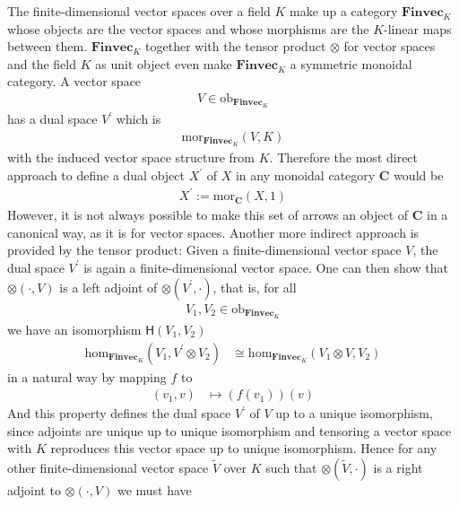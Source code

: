 \begin{exa}
\label{exa:finvecmoncat}
The finite-dimensional vector spaces over a field $K$ make up a category $\mathbf{Finvec}_{K}$ whose objects are the vector spaces and whose morphisms are the $K$-linear maps between them.
$\mathbf{Finvec}_{K}$ together with the tensor product $\otimes$ for vector spaces and the field $K$ as unit object even make $\mathbf{Finvec}_{K}$ a symmetric monoidal category.
A vector space
\begin{align*}
  V
  \in
  \mathrm{ob}_{\mathbf{Finvec}_{K}}
\end{align*}
has a dual space $V^{\prime}$ which is
\begin{align*}
  \mathrm{mor}_{\mathbf{Finvec}_{K}}(V,K)
\end{align*}
with the induced vector space structure from $K$.
Therefore the most direct approach to define a dual object $X^{\prime}$ of $X$ in any monoidal category $\mathbf{C}$ would be
\begin{align*}
  X^{\prime}
  :=
  \mathrm{mor}_{\mathbf{C}}(X,1)
\end{align*}
However, it is not always possible to make this set of arrows an object of $\mathbf{C}$ in a canonical way, as it is for vector spaces.
Another more indirect approach is provided by the tensor product: Given a finite-dimensional vector space $V$, the dual space $V^{\prime}$ is again a finite-dimensional vector space.
One can then show that $\otimes(\cdot,V)$ is a left adjoint of $\otimes(V^{\prime},\cdot)$, that is, for all
\begin{align*}
  V_{1},
  V_{2}
  \in
  \mathrm{ob}_{\mathbf{Finvec}_{K}}
\end{align*}
we have an isomorphism $\mathsf{H}(V_{1},V_{2})$
\begin{align*}
  \mathrm{hom}_{\mathbf{Finvec}_{K}}
  \left(
    V_{1},
    V^{\prime}
    \otimes
    V_{2}
  \right)
  &\cong
  \mathrm{hom}_{\mathbf{Finvec}_{K}}
  \left(
    V_{1}
    \otimes
    V,
    V_{2}
  \right)
\end{align*}
in a natural way by mapping $f$ to
\begin{align*}
  (v_{1},v)
  &\mapsto
  \left(
    f(v_{1})
  \right)
  (v)
\end{align*}
And this property defines the dual space $V^{\prime}$ of $V$ up to a unique isomorphism, since adjoints are unique up to unique isomorphism and tensoring a vector space with $K$ reproduces this vector space up to unique isomorphism.
Hence for any other finite-dimensional vector space $\tilde{V}$ over $K$ such that $\otimes(\tilde{V},\cdot)$ is a right adjoint to $\otimes(\cdot,V)$ we must have

\end{exa}
